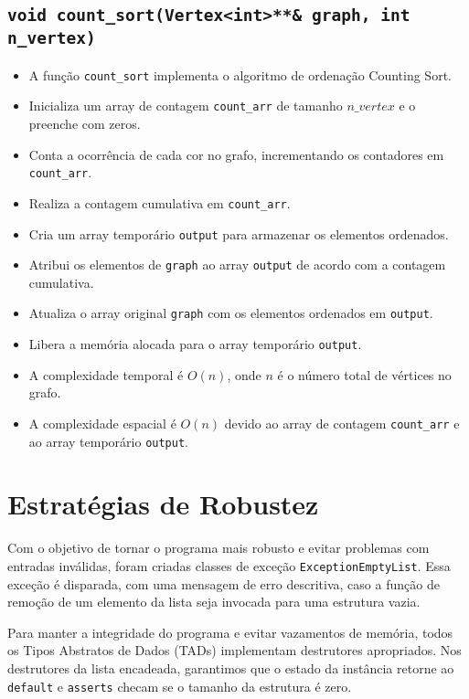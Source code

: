\documentclass{article}
\begin{document}

\subsection{\texttt{void count\_sort(Vertex<int>**\& graph, int n\_vertex)}}
\begin{itemize}
    \item A função \texttt{count\_sort} implementa o algoritmo de ordenação Counting Sort.
    \item Inicializa um array de contagem \texttt{count\_arr} de tamanho \(n\_vertex\) e o preenche com zeros.
    \item Conta a ocorrência de cada cor no grafo, incrementando os contadores em \texttt{count\_arr}.
    \item Realiza a contagem cumulativa em \texttt{count\_arr}.
    \item Cria um array temporário \texttt{output} para armazenar os elementos ordenados.
    \item Atribui os elementos de \texttt{graph} ao array \texttt{output} de acordo com a contagem cumulativa.
    \item Atualiza o array original \texttt{graph} com os elementos ordenados em \texttt{output}.
    \item Libera a memória alocada para o array temporário \texttt{output}.
    \item A complexidade temporal é \(O(n)\), onde \(n\) é o número total de vértices no grafo.
    \item A complexidade espacial é \(O(n)\) devido ao array de contagem \texttt{count\_arr} e ao array temporário \texttt{output}.
\end{itemize}





\section{Estratégias de Robustez}
Com o objetivo de tornar o programa mais robusto e evitar problemas com entradas inválidas, foram criadas classes de exceção \texttt{ExceptionEmptyList}. Essa exceção é disparada, com uma mensagem de erro descritiva, caso a função de remoção de um elemento da lista seja invocada para uma estrutura vazia. 

Para manter a integridade do programa e evitar vazamentos de memória, todos os Tipos Abstratos de Dados (TADs) implementam destrutores apropriados. Nos destrutores da lista encadeada, garantimos que o estado da instância retorne ao \texttt{default} e \texttt{asserts} checam se o tamanho da estrutura é zero.
\end{document}
